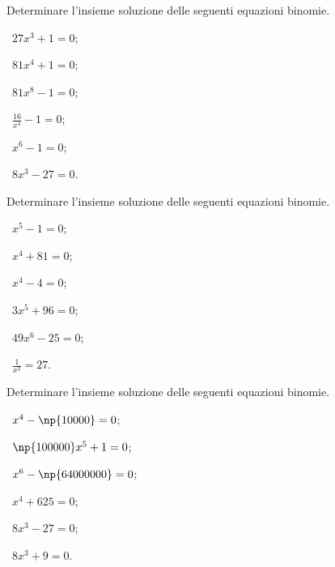 \begin{esercizio}[\Ast]
 \label{ese:5.13}
Determinare l'insieme soluzione delle seguenti equazioni binomie.
\begin{multicols}{3}
 \begin{enumeratea}
 \item~$27x^3+1=0$;
 \item~$81x^4+1=0$;
 \item~$81x^8-1=0$;
 \item~$\frac{16}{x^4}-1=0$;
 \item~$x^6-1=0$;
 \item~$8x^3-27=0$.
 \end{enumeratea}
 \end{multicols}
\end{esercizio}

\begin{esercizio}[\Ast]
 \label{ese:5.14}
Determinare l'insieme soluzione delle seguenti equazioni binomie.
\begin{multicols}{3}
 \begin{enumeratea}
 \item~$x^5-1=0$;
 \item~$x^4+81=0$;
 \item~$x^4-4=0$;
 \item~$3x^5+96=0$;
 \item~$49x^6-25=0$;
 \item~$\frac 1{x^3}=27$.
 \end{enumeratea}
 \end{multicols}
\end{esercizio}
\pagebreak
\begin{esercizio}[\Ast]
 \label{ese:5.15}
Determinare l'insieme soluzione delle seguenti equazioni binomie.
\begin{multicols}{3}
 \begin{enumeratea}
 \item~$x^4-\np{10000}=0$;
 \item~$\np{100000}x^5+1=0$;
 \item~$x^6-\np{64000000}=0$;
 \item~$x^4+625=0$;
 \item~$8x^3-27=0$;
 \item~$8x^3+9=0$.
 \end{enumeratea}
 \end{multicols}
\end{esercizio}


